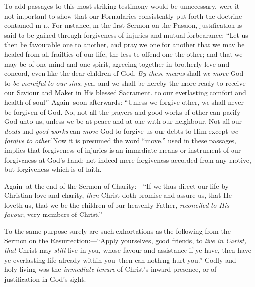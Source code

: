 To add passages to this most striking testimony
would be unnecessary, were it not important to show that our
Formularies consistently put forth the doctrine contained in it. For
instance, in the first Sermon on the Passion, justification is said to
be gained through forgiveness of injuries and mutual forbearance:
``Let us then be favourable one to another, and pray we one for
another that we may be healed from all frailties of our life, the less
to offend one the other; and that we may be of one mind and one
spirit, agreeing together in brotherly love and concord, even like the
dear children of God. \emph{By these means} shall we \emph{move} God
to \emph{be merciful to our sins}; yea, and we shall be hereby the
more ready to receive our Saviour and Maker in His blessed Sacrament,
to our everlasting comfort and health of soul.'' Again, soon
afterwards: ``Unless we forgive other, we shall never be forgiven
of God. No, not all the prayers and good works of other can pacify God
unto us, unless we be at peace and at one with our neighbour. Not all
our \emph{deeds} and \emph{good works} can \emph{move} God to forgive
us our debts to Him except \emph{we forgive to other}.'\emph{}Now
it is presumed the word ``move,'' used in these passages,
implies that forgiveness of injuries is an immediate means or
instrument of our forgiveness at God's hand; not indeed mere
forgiveness accorded from any motive, but forgiveness which is of
faith.

Again, at the end of the Sermon of Charity:—``If
we thus direct our life by Christian love and charity, \emph{then}
Christ doth promise and assure us, that He loveth us, that we be the
children of our heavenly Father, \emph{reconciled to His favour}, very
members of Christ.''

To the same purpose surely are such exhortations as
the following from the Sermon on the Resurrection:—``Apply
yourselves, good friends, to \emph{live in Christ, that} Christ may \emph{still}
live in you, whose favour and assistance if ye have, then have ye
everlasting life already within you, then can nothing hurt you.''
Godly and holy living was the \emph{immediate tenure} of Christ's
inward presence, or of justification in God's sight.

